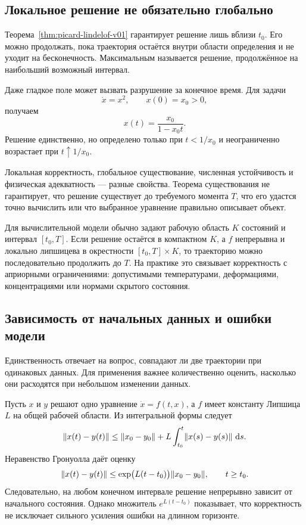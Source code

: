 \subsection{Локальное решение не обязательно глобально}

Теорема~\ref{thm:picard-lindelof-v01} гарантирует решение лишь вблизи $t_0$. Его можно продолжать, пока траектория остаётся внутри области определения и не уходит на бесконечность. Максимальным называется решение, продолжённое на наибольший возможный интервал.

Даже гладкое поле может вызвать разрушение за конечное время. Для задачи
\begin{equation}
\label{eq:finite-time-blow-up-v01}
\dot x=x^2,
\qquad
x(0)=x_0>0,
\end{equation}
получаем
\begin{equation}
\label{eq:finite-time-blow-up-solution-v01}
x(t)=\frac{x_0}{1-x_0t}.
\end{equation}
Решение единственно, но определено только при $t<1/x_0$ и неограниченно возрастает при $t\uparrow1/x_0$.

\begin{caution}
Локальная корректность, глобальное существование, численная устойчивость и физическая адекватность --- разные свойства. Теорема существования не гарантирует, что решение существует до требуемого момента $T$, что его удастся точно вычислить или что выбранное уравнение правильно описывает объект.
\end{caution}

Для вычислительной модели обычно задают рабочую область $K$ состояний и интервал $[t_0,T]$. Если решение остаётся в компактном $K$, а $f$ непрерывна и локально липшицева в окрестности $[t_0,T]\times K$, то траекторию можно последовательно продолжить до $T$. На практике это связывает корректность с априорными ограничениями: допустимыми температурами, деформациями, концентрациями или нормами скрытого состояния.

\subsection{Зависимость от начальных данных и ошибки модели}

Единственность отвечает на вопрос, совпадают ли две траектории при одинаковых данных. Для применения важнее количественно оценить, насколько они расходятся при небольшом изменении данных.

Пусть $x$ и $y$ решают одно уравнение $\dot x=f(t,x)$, а $f$ имеет константу Липшица $L$ на общей рабочей области. Из интегральной формы следует
\[
\lVert x(t)-y(t)\rVert
\leq
\lVert x_0-y_0\rVert
+
L\int_{t_0}^{t}\lVert x(s)-y(s)\rVert\,\mathop{}\!\mathrm{d} s.
\]
Неравенство Гронуолла даёт оценку
\begin{equation}
\label{eq:initial-data-stability-v01}
\lVert x(t)-y(t)\rVert
\leq
\exp\bigl(L(t-t_0)\bigr)
\lVert x_0-y_0\rVert,
\qquad t\geq t_0.
\end{equation}
Следовательно, на любом конечном интервале решение непрерывно зависит от начального состояния. Однако множитель $e^{L(t-t_0)}$ показывает, что корректность не исключает сильного усиления ошибки на длинном горизонте.

